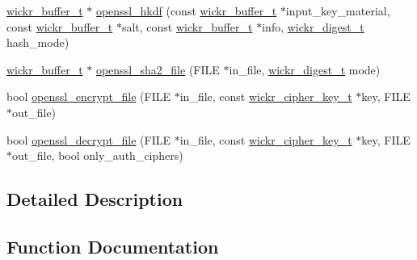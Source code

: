 \begin{DoxyCompactItemize}
\item 
\hyperlink{structwickr__buffer}{wickr\+\_\+buffer\+\_\+t} $\ast$ \hyperlink{group__openssl__crypto_ga788a03002d8c6048401cf0bbc2d48c7a}{openssl\+\_\+hkdf} (const \hyperlink{structwickr__buffer}{wickr\+\_\+buffer\+\_\+t} $\ast$input\+\_\+key\+\_\+material, const \hyperlink{structwickr__buffer}{wickr\+\_\+buffer\+\_\+t} $\ast$salt, const \hyperlink{structwickr__buffer}{wickr\+\_\+buffer\+\_\+t} $\ast$info, \hyperlink{structwickr__digest}{wickr\+\_\+digest\+\_\+t} hash\+\_\+mode)
\item 
\hyperlink{structwickr__buffer}{wickr\+\_\+buffer\+\_\+t} $\ast$ \hyperlink{group__openssl__crypto_ga12da75115315fbf7394f4791a2eb815c}{openssl\+\_\+sha2\+\_\+file} (F\+I\+LE $\ast$in\+\_\+file, \hyperlink{structwickr__digest}{wickr\+\_\+digest\+\_\+t} mode)
\item 
bool \hyperlink{group__openssl__crypto_ga178fa1f33ad2767c27411c3ebcdd3ca0}{openssl\+\_\+encrypt\+\_\+file} (F\+I\+LE $\ast$in\+\_\+file, const \hyperlink{structwickr__cipher__key}{wickr\+\_\+cipher\+\_\+key\+\_\+t} $\ast$key, F\+I\+LE $\ast$out\+\_\+file)
\item 
bool \hyperlink{group__openssl__crypto_gaf1faa509e06c188acfbdf43e2197c61a}{openssl\+\_\+decrypt\+\_\+file} (F\+I\+LE $\ast$in\+\_\+file, const \hyperlink{structwickr__cipher__key}{wickr\+\_\+cipher\+\_\+key\+\_\+t} $\ast$key, F\+I\+LE $\ast$out\+\_\+file, bool only\+\_\+auth\+\_\+ciphers)
\end{DoxyCompactItemize}


\subsection{Detailed Description}


\subsection{Function Documentation}
\mbox{\label{group__openssl__crypto_ga75eaf118b28fb76e75579d0a74517b18}} 
